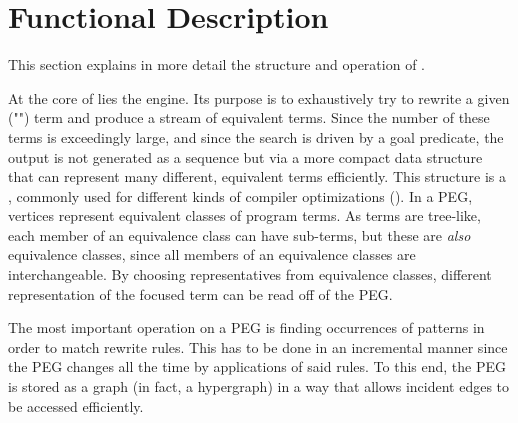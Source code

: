 \section{Functional Description}

This section explains in more detail the structure and operation of \TransCal.

At the core of \TransCal lies the  engine.
Its purpose is to exhaustively try to rewrite a given ("")
term and produce a stream of equivalent terms.
Since the number of these terms is exceedingly large, and since the search
is driven by a goal predicate, the output is not generated as a sequence
but via a more compact data structure that can represent many different,
equivalent terms efficiently.
This structure is a , commonly used
for different kinds of compiler optimizations (\cite{}).
In a PEG, vertices represent equivalent classes of program terms.
As terms are tree-like, each member of an equivalence class can have
sub-terms, but these are \emph{also} equivalence classes, since all
members of an equivalence classes are interchangeable.
By choosing representatives from equivalence classes, different representation
of the focused term can be read off of the PEG.

The most important operation on a PEG is finding occurrences of patterns in
order to match rewrite rules.
This has to be done in an incremental manner since the PEG changes all the
time by applications of said rules.
To this end, the PEG is stored as a graph (in fact, a hypergraph) in a way
that allows incident edges to be accessed efficiently.


